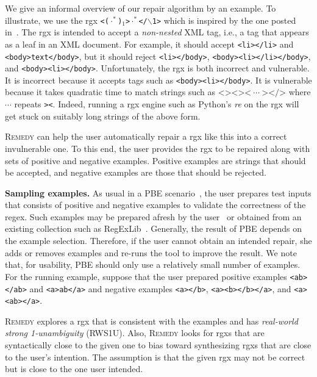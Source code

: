 \documentclass[conference]{IEEEtran}
\newcommand{\tool}{\textsc{Remedy}}
\newcommand{\any}{\cdot}
\newcommand{\ltp}{RWS1U}
\begin{document}
We give an informal overview of our repair algorithm by an example.  To illustrate, we use the {rgx}  \texttt{<($\any^*$)$_1$>$\any^*$</$\backslash$1>} which is inspired by the one posted in~\cite{GTsBlog}.
The {rgx} is intended to accept a {\em non-nested} XML tag, i.e., a tag that appears as a leaf in an XML document. 
For example, it should accept \texttt{<li></li>} and \texttt{<body>text</body>}, but it should reject \texttt{<li></body>}, \texttt{<body><li></li></body>}, and \texttt{<body><li></body>}.
Unfortunately, the {rgx} is both incorrect and vulnerable.  It is incorrect because it accepts tags such as \texttt{<body><li></body>}.  It is vulnerable because it takes quadratic time to match strings such as
$\texttt{<}\texttt{><}\texttt{><}\:\cdots\:\texttt{></>}$ where $\cdots$ repeats \texttt{><}.  Indeed, running a {rgx} engine such as Python's {\em re} on the {rgx} will get stuck on suitably long strings of the above form.  





\tool{} can help the user automatically repair a {rgx} like this into a correct invulnerable one.
To this end, the user provides the {rgx} to be repaired along with sets of positive and negative examples.  Positive examples are strings that should be accepted, and negative examples are those that should be rejected.


{\flushleft\bf Sampling examples.}
As usual in a PBE scenario~\cite{10.1145/3360565, DBLP:journals/corr/abs-1908-03316, FlashRegex, 10.1145/3093335.2993244}, the user prepares test inputs that consists of positive and negative examples to validate the correctness of the regex.  Such examples may be prepared afresh by the user~\cite{8952499} or obtained from an existing collection such as RegExLib~\cite{regexlib}.
Generally, the result of PBE depends on the example selection.  Therefore, if the user cannot obtain an intended repair, she adds or removes examples and re-runs the tool to improve the result.
We note that, for usability, PBE should only use a relatively small number of examples.
For the running example, suppose that the user prepared positive examples \texttt{<ab></ab>} and \texttt{<a>ab</a>} and negative examples \texttt{<a></b>},  \texttt{<a><b></b></a>}, and \texttt{<a><ab></a>}.



\tool{} explores a {rgx} that is consistent with the examples and has {\it real-world strong 1-unambiguity} (\ltp{}).  Also, \tool{} looks for {rgxs} that are syntactically close to the given one to bias toward synthesizing {rgxs} that are close to the user's intention.  The assumption is that the given {rgx} may not be correct but is close to the one user intended.
\end{document}

